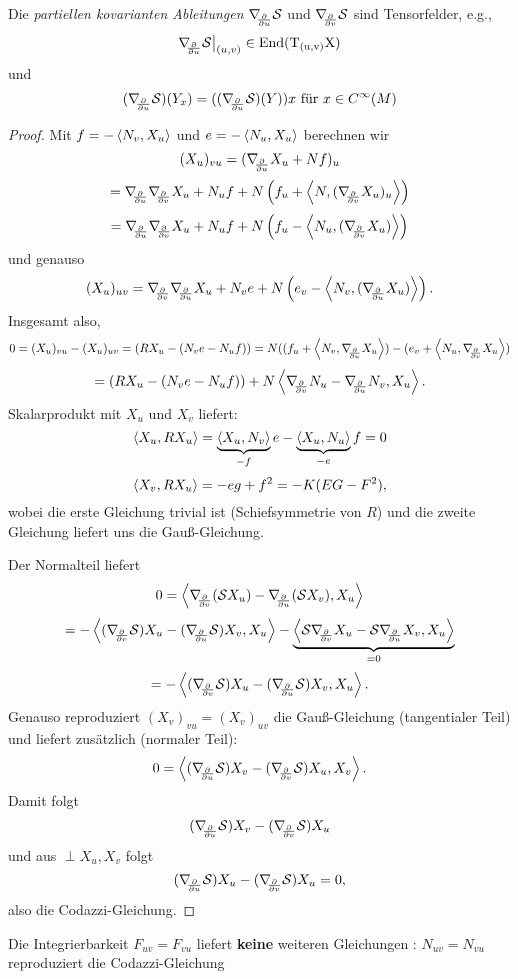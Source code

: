\begin{remark}
	
	Die \emph{partiellen kovarianten Ableitungen} $ \D{u} \s $ und $ \D v \s $ sind Tensorfelder, e.g.,
		\[ \D{u} \s\big|_{(u,v)} \in \mathrm{End(T_{(u,v)}X)} \] und
		\[ ( \D{u}\s )(Y_x) = ((\D{u} \s) (Y))x \text{ für } x \in C^\infty(M) \]
	
\end{remark}

\begin{proof}
	
	Mit $ f = - \skal{N_v,X_u} $ und $ e= - \skal{N_u,X_u} $ berechnen wir
		\[ (X_u)_{vu} = (\D{u}X_u + Nf)_u \]
		\[ = \D{u} \D v X_u + N_{u}f + N\left (f_u+\skal{N,(\D vX_u)_u}\right ) \]
		\[ = \D{u} \D v X_u + N_{u}f + N\left (f_u-\skal{N_u,(\D vX_u)}\right ) \] 
	und genauso
		\[ (X_u)_{uv} = \D v \D{u} X_u + N_{v}e + N\left (e_v - \skal{N_v,(\D{u}X_u)}\right ). \]
	Insgesamt also,
		\[ 0 = (X_u)_{vu} - (X_u)_{uv} = (RX_u - (N_ve - N_uf)) = N(( f_u + \skal{N_v,\D{u}X_u} ) - ( e_v + \skal{ N_u, \D vX_u} ) \]
		\[ = (RX_u - (N_ve -N_uf) ) + N \skal{ \D v N_u - \D{u}N_v, X_u}. \]
	Skalarprodukt mit $ X_u $ und $ X_v $ liefert:
		\[ \skal{X_u,RX_u} = \underbrace{\skal{X_u,N_v}}_{-f}e - \underbrace{\skal{X_u,N_u}}_{-e}f = 0 \]
		\[ \skal{X_v,RX_u} = -eg + f^2 = - K(EG - F^2), \]
	wobei die erste Gleichung trivial ist (Schiefsymmetrie von $ R $) und die zweite Gleichung liefert uns die Gauß-Gleichung.
	
	Der Normalteil liefert 
		\[ 0 = \skal{\D v(\s X_u) - \D{u}(\s X_v),X_u } \]
		\[= - \skal{(\D v\s)X_u - (\D{u}\s)X_v,X_u} - \underbrace{\skal{\s \D vX_u- \s \D{u} X_v,X_u }}_{=0} \]
		\[= - \skal{(\D v\s)X_u - (\D{u}\s)X_v,X_u}. \]
	Genauso reproduziert $ (X_v)_{vu}=(X_v)_{uv} $ die Gauß-Gleichung (tangentialer Teil) und liefert zusätzlich (normaler Teil):
			\[ 0 = \skal{(\D{u} \s)X_v - (\D v\s)X_u,X_v}. \]
		Damit folgt
			\[ (\D{u} \s)X_v - (\D v\s)X_u  \]
		und aus $\perp X_u,X_v$ folgt
			\[ (\D{u} \s) X_u - (\D v\s)X_u = 0, \]
		also die Codazzi-Gleichung.
		
	
\end{proof}


\begin{remark}
	
	Die Integrierbarkeit $ F_{uv} = F_{vu} $ liefert \textbf{keine} weiteren Gleichungen : $ N_{uv}=N_{vu} $ reproduziert die Codazzi-Gleichung
	
\end{remark}

